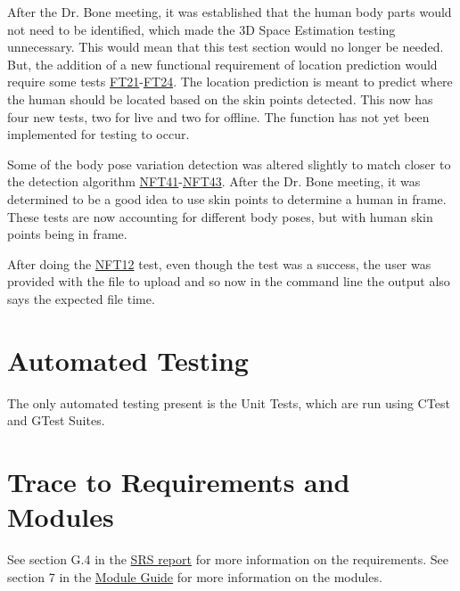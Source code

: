 \documentclass[12pt, titlepage]{article}
\begin{document}
After the Dr. Bone meeting, it was established that the human body parts would not need to be identified, which made the 3D Space Estimation testing unnecessary. This would mean that this test section would no longer be needed. But, the addition of a new functional requirement of location prediction would require some tests \hyperref[FT21]{FT21}-\hyperref[FT24]{FT24}. The location prediction is meant to predict where the human should be located based on the skin points detected. This now has four new tests, two for live and two for offline. The function has not yet been implemented for testing to occur.

Some of the body pose variation detection was altered slightly to match closer to the detection algorithm \hyperref[NFT41]{NFT41}-\hyperref[NFT43]{NFT43}. After the Dr. Bone meeting, it was determined to be a good idea to use skin points to determine a human in frame. These tests are now accounting for different body poses, but with human skin points being in frame.

After doing the \hyperref[NFT12]{NFT12}  test, even though the test was a success, the user was provided with the file to upload and so now in the command line the output also says the expected file time.


\section{Automated Testing}

The only automated testing present is the Unit Tests, which are run using CTest and GTest Suites.
		
\section{Trace to Requirements and Modules}		
See section G.4 in the \href{https://github.com/takhtart/PCD/blob/main/docs/SRS/SRS.pdf}{SRS report} for more information on the requirements. See section 7 in the \href{https://github.com/takhtart/PCD/blob/main/docs/Design/SoftArchitecture/MG.pdf}{Module Guide} for more information on the modules.
\end{document}
